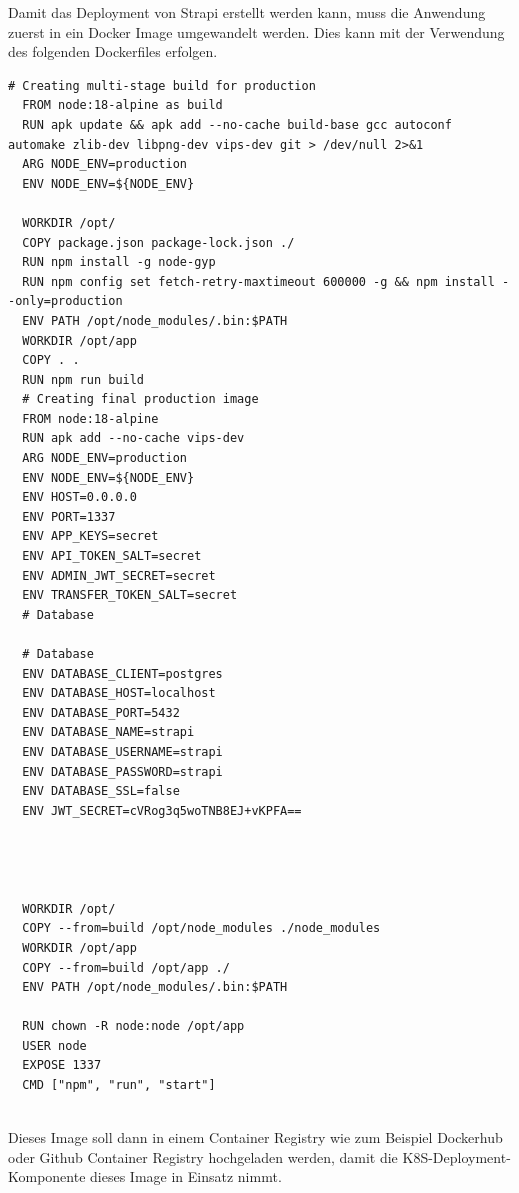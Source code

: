 Damit das Deployment von Strapi erstellt werden kann, muss die Anwendung zuerst in ein Docker Image umgewandelt werden. Dies kann mit der Verwendung des folgenden Dockerfiles erfolgen.
\begin{lstlisting}[caption=Strapi Dockerfile]
  # Creating multi-stage build for production
  FROM node:18-alpine as build
  RUN apk update && apk add --no-cache build-base gcc autoconf automake zlib-dev libpng-dev vips-dev git > /dev/null 2>&1
  ARG NODE_ENV=production
  ENV NODE_ENV=${NODE_ENV}
  
  WORKDIR /opt/
  COPY package.json package-lock.json ./
  RUN npm install -g node-gyp
  RUN npm config set fetch-retry-maxtimeout 600000 -g && npm install --only=production
  ENV PATH /opt/node_modules/.bin:$PATH
  WORKDIR /opt/app
  COPY . .
  RUN npm run build
  # Creating final production image
  FROM node:18-alpine
  RUN apk add --no-cache vips-dev
  ARG NODE_ENV=production
  ENV NODE_ENV=${NODE_ENV}
  ENV HOST=0.0.0.0
  ENV PORT=1337
  ENV APP_KEYS=secret
  ENV API_TOKEN_SALT=secret
  ENV ADMIN_JWT_SECRET=secret
  ENV TRANSFER_TOKEN_SALT=secret
  # Database
  
  # Database
  ENV DATABASE_CLIENT=postgres
  ENV DATABASE_HOST=localhost
  ENV DATABASE_PORT=5432
  ENV DATABASE_NAME=strapi
  ENV DATABASE_USERNAME=strapi
  ENV DATABASE_PASSWORD=strapi
  ENV DATABASE_SSL=false
  ENV JWT_SECRET=cVRog3q5woTNB8EJ+vKPFA==
  
  
  
  
  WORKDIR /opt/
  COPY --from=build /opt/node_modules ./node_modules
  WORKDIR /opt/app
  COPY --from=build /opt/app ./
  ENV PATH /opt/node_modules/.bin:$PATH
  
  RUN chown -R node:node /opt/app
  USER node
  EXPOSE 1337
  CMD ["npm", "run", "start"]
    
\end{lstlisting}

Dieses Image soll dann in einem Container Registry wie zum Beispiel
Dockerhub oder Github Container Registry hochgeladen werden,
damit die K8S-Deployment-Komponente dieses Image in Einsatz nimmt.




